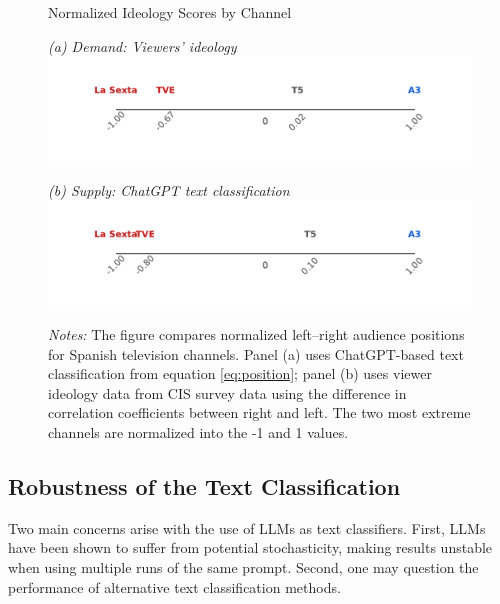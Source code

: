 \documentclass[12pt]{article}
\begin{document}
	
		\begin{figure}[ht]
		\centering
		\caption{Normalized Ideology Scores by Channel}
		\begin{minipage}[t]{0.48\textwidth}
			\centering
					\textit{(a) Demand: Viewers' ideology}
		\includegraphics[width=\linewidth]{figures/congress_line_cis}
		\end{minipage}
		\hfill
		\begin{minipage}[t]{0.48\textwidth}
			\centering

			
				\textit{(b) Supply: ChatGPT text classification}
			\includegraphics[width=\linewidth]{figures/congress_line_chatgpt}
			
			
		\end{minipage}
		
		
		\caption*{\small \textit{Notes:} The figure compares normalized left–right audience positions for Spanish television channels. Panel (a) uses ChatGPT-based text classification from equation \ref{eq:position}; panel (b) uses viewer ideology data from CIS survey data using the difference in correlation coefficients between right and left. The two most extreme channels are normalized into the -1 and 1 values. }
		\label{fig:channel_ideology_lines}
	\end{figure}
	
	
\subsection*{Robustness of the Text Classification}

Two main concerns arise with the use of LLMs as text classifiers. First, LLMs have been shown to suffer from potential stochasticity, making results unstable when using multiple runs of the same prompt. Second, one may question the performance of alternative text classification methods.
\end{document}

